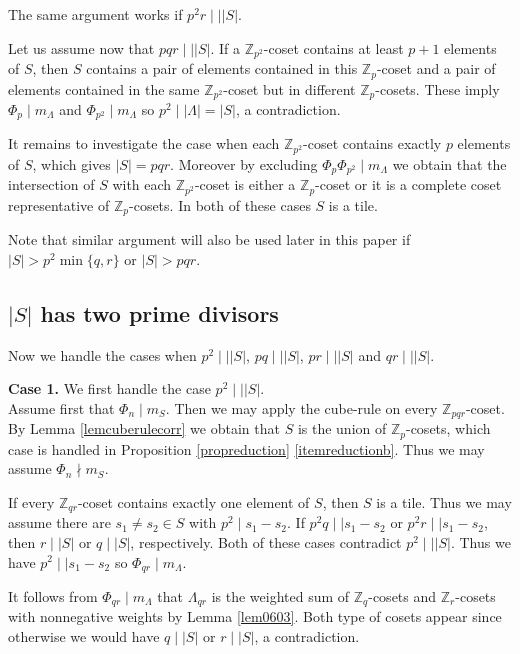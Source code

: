 \documentclass[10pt]{article}
\newcommand{\Z}{\mathbb{Z}}
\newcommand{\La}{\Lambda}
\begin{document}
        The same argument works if $p^2r\mid\mid |S|$.
        
        Let us assume now that $pqr \mid \mid |S|$. If a $\Z_{p^2}$-coset contains at least $p+1$ elements of $S$, then $S$ contains a pair of elements contained in this $\Z_p$-coset and a pair of elements contained in the same $\Z_{p^2}$-coset but in different $\Z_p$-cosets. These imply $\Phi_p \mid m_{\La} $ and $\Phi_{p^2} \mid m_{\La} $ so $p^2 \mid |\La|=|S|$, a contradiction.  
        
        It remains to investigate the case when each $\Z_{p^2}$-coset contains exactly $p$ elements of $S$, which gives $|S|=pqr$. Moreover by excluding $\Phi_p \Phi_{p^2} \mid m_{\La}$ we obtain that 
        the intersection of $S$ with each $\Z_{p^2}$-coset is either a $\Z_p$-coset or it is a complete coset representative of $\Z_p$-cosets. In both of these cases $S$ is a tile. 
        
        Note that similar argument will also be used later in this paper if $|S|>p^2 \min \{q,r\}$ or $|S|>pqr$. 
        \subsection{$|S|$ has two prime divisors} Now we handle the cases when $p^2 \mid \mid |S|$, $pq \mid\mid |S|$, $pr \mid\mid |S|$ and $qr \mid\mid |S|$. 
        
        {\bf Case 1.} 
        We first handle the case $p^2 \mid \mid |S|$. \\
        Assume first that  $\Phi_n \mid m_S$. Then we may apply the cube-rule on every $\Z_{pqr}$-coset. By Lemma \ref{lemcuberulecorr}
        we obtain that $S$ is the union of $\Z_p$-cosets, which case is handled in Proposition \ref{propreduction}  \ref{itemreductionb}. Thus we may assume $\Phi_n \nmid m_S$.
        
        
        If every $\Z_{qr}$-coset contains exactly one element of $S$, then $S$ is a tile. Thus we may assume there are $s_1 \ne s_2 \in S$ with $p^2 \mid s_1-s_2$. If $p^2q \mid\mid s_1-s_2$ or $p^2r \mid\mid s_1-s_2$, then $r \mid |S|$ or $q \mid |S|$, respectively. Both of these cases contradict 
         $p^2 \mid \mid |S|$.
         Thus we have $p^2 \mid \mid s_1-s_2$ so $\Phi_{qr} \mid m_{\Lambda}$.
        
        
        
         It follows from $\Phi_{qr} \mid m_{\La}$ that $\La_{qr}$ is the weighted sum of $\Z_q$-cosets and $\Z_r$-cosets with nonnegative weights by Lemma \ref{lem0603}. Both type of cosets appear since otherwise 
        we would have $q  \mid |S|$ or $r  \mid |S|$, a contradiction. 
        
\end{document}
